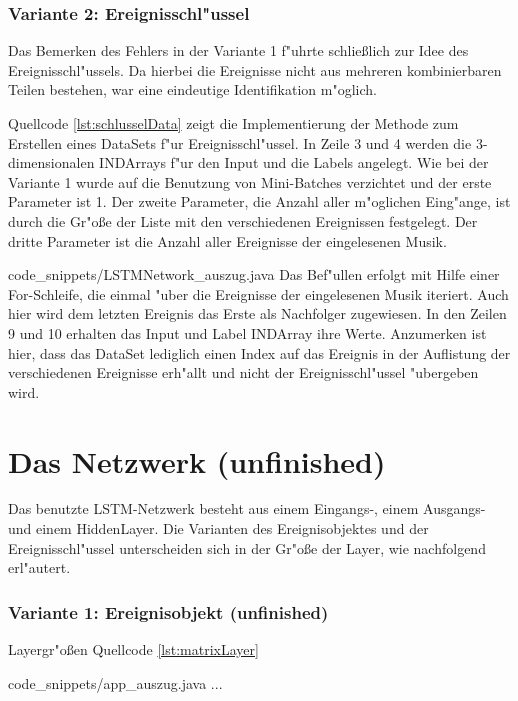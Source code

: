 {\subsubsection{Variante 2: Ereignisschl"ussel}
Das Bemerken des Fehlers in der Variante 1 f"uhrte schlie{\ss}lich zur Idee des Ereignisschl"ussels. Da hierbei die Ereignisse nicht aus mehreren kombinierbaren Teilen bestehen, war eine eindeutige Identifikation m"oglich.

Quellcode \ref{lst:schlusselData} zeigt die Implementierung der Methode zum Erstellen eines DataSets f"ur Ereignisschl"ussel. In Zeile 3 und 4 werden die 3-dimensionalen INDArrays f"ur den Input und die Labels angelegt. Wie bei der Variante 1 wurde auf die Benutzung von Mini-Batches verzichtet und der erste Parameter ist 1. Der zweite Parameter, die Anzahl aller m"oglichen Eing"ange, ist durch die Gr"o{\ss}e der Liste mit den verschiedenen Ereignissen festgelegt. Der dritte Parameter ist die Anzahl aller Ereignisse der eingelesenen Musik.

{code_snippets/LSTMNetwork_auszug.java}
Das Bef"ullen erfolgt mit Hilfe einer For-Schleife, die einmal "uber die Ereignisse der eingelesenen Musik iteriert. Auch hier wird dem letzten Ereignis das Erste als Nachfolger zugewiesen. In den Zeilen 9 und 10 erhalten das Input und Label INDArray ihre Werte. Anzumerken ist hier, dass das DataSet lediglich einen Index auf das Ereignis in der Auflistung der verschiedenen Ereignisse erh"allt und nicht der Ereignisschl"ussel "ubergeben wird.



\section{Das Netzwerk (unfinished)}
Das benutzte LSTM-Netzwerk besteht aus einem Eingangs-, einem Ausgangs- und einem HiddenLayer. Die Varianten des Ereignisobjektes und der Ereignisschl"ussel unterscheiden sich in der Gr"o{\ss}e der Layer, wie nachfolgend erl"autert.

\subsubsection{Variante 1: Ereignisobjekt (unfinished) }
Layergr"o{\ss}en
Quellcode \ref{lst:matrixLayer}

{code_snippets/app_auszug.java}
...

}
